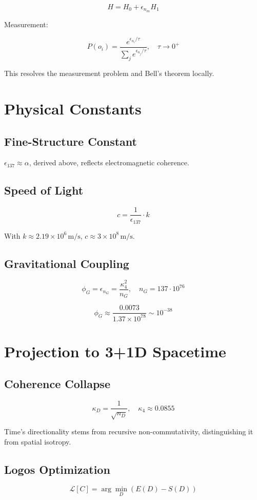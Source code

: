 \documentclass[12pt]{article}
\begin{document}
\[
H = H_0 + \epsilon_{n_m} H_1
\]

Measurement:

\[
P(o_i) = \frac{e^{\epsilon_{n_i} / \tau}}{\sum_j e^{\epsilon_{n_j} / \tau}}, \quad \tau \to 0^+
\]

This resolves the measurement problem and Bell's theorem locally.

\section{Physical Constants}
\subsection{Fine-Structure Constant}
\(\epsilon_{137} \approx \alpha\), derived above, reflects electromagnetic coherence.

\subsection{Speed of Light}
\[
c = \frac{1}{\epsilon_{137}} \cdot k
\]

With \(k \approx 2.19 \times 10^6 \, \text{m/s}\), \(c \approx 3 \times 10^8 \, \text{m/s}\).

\subsection{Gravitational Coupling}
\[
\phi_G = \epsilon_{n_G} = \frac{\kappa_4^2}{n_G}, \quad n_G = 137 \cdot 10^{76}
\]

\[
\phi_G \approx \frac{0.0073}{1.37 \times 10^{78}} \sim 10^{-38}
\]

\section{Projection to 3+1D Spacetime}
\subsection{Coherence Collapse}
\[
\kappa_D = \frac{1}{\sqrt{n_D}}, \quad \kappa_4 \approx 0.0855
\]

Time's directionality stems from recursive non-commutativity, distinguishing it from spatial isotropy.

\subsection{Logos Optimization}
\[
\mathcal{L}[C] = \arg\min_D (E(D) - S(D))
\]
\end{document}
